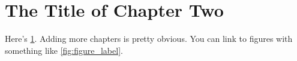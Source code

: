 \chapter{The Title of Chapter Two}
\label{chapter:one}

Here's \cref{chapter:one}. Adding more chapters is pretty obvious. You can link to figures with something like \ref{fig:figure_label}.
